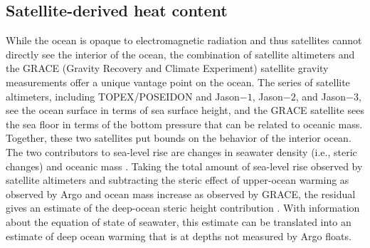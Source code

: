 \documentclass[authoryear,round,12pt]{article}
\begin{document}




\subsection{Satellite-derived heat content}
\label{sec:satell-deriv-heat}

While the ocean is opaque to electromagnetic radiation and thus
satellites cannot directly see the interior of the ocean, the
combination of satellite altimeters and the GRACE (Gravity Recovery
and Climate Experiment) satellite gravity measurements offer a unique
vantage point on the ocean. The series of satellite altimeters,
including TOPEX/POSEIDON and Jason$-1$, Jason$-2$, and Jason$-3$, see
the ocean surface in terms of sea surface height, and the GRACE
satellite sees the sea floor in terms of the bottom pressure that can
be related to oceanic mass. Together, these two satellites put bounds
on the behavior of the interior ocean. The two contributors to
sea-level rise are changes in seawater density (i.e., steric changes)
and oceanic mass \citep[e.g.,][]{Munk--2002:Twentieth}.  Taking the
total amount of sea-level rise observed by satellite altimeters and
subtracting the steric effect of upper-ocean warming as observed by
Argo and ocean mass increase as observed by GRACE, the residual gives
an estimate of the deep-ocean steric height contribution
\citep{Leuliette-Miller-2009:Closing}. With information about the
equation of state of seawater, this estimate can be translated into an
estimate of deep ocean warming that is at depths not measured by Argo
floats.
\end{document}
